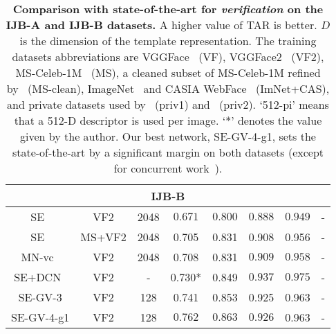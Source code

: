 \documentclass[runningheads]{llncs}
\begin{document}
\begin{table*}[t]
\begin{center}
{{\begin{tabular}{c|c|c|c|c|c|c|c}
\multicolumn{8}{c}{IJB-B} \\ \hline
SE~\cite{Cao18} & VF2 & 2048 &  $0.671$ & $0.800$ & $0.888$ & $0.949$ &  -\\
SE~\cite{Cao18}  & MS+VF2 & 2048 & 0.705 & 0.831 & 0.908 &0.956 & -\\

MN-vc~\cite{Xie18b} & VF2 & 2048 & 0.708 & 0.831 & $0.909$  & $0.958$ & - \\
SE+DCN~\cite{Xie18a} & VF2 & - & 0.730* & 0.849 & $\mathbf{0.937}$  & $\mathbf{0.975}$ & - \\

SE-GV-3 & VF2 & 128 & 0.741 & 0.853 & 0.925 & 0.963 & - \\
SE-GV-4-g1 & VF2  & 128 & $\mathbf{0.762}$ & $\mathbf{0.863}$ & $0.926$ & 0.963 & -\\



\hline
\end{tabular}}}
\end{center}
\vspace{-1.5mm}
\caption{\textbf{Comparison with state-of-the-art for
{\em verification} on the IJB-A and IJB-B datasets.}
A higher value of TAR is better.
$D$ is the dimension of the 
template representation.
The training datasets abbreviations are VGGFace~\cite{Parkhi15} (VF), 
VGGFace2~\cite{Cao18} (VF2), MS-Celeb-1M~\cite{Guo16} (MS),
a cleaned subset of MS-Celeb-1M refined by~\cite{Zheng18} (MS-clean),
ImageNet~\cite{Russakovsky15} and CASIA WebFace~\cite{Yi14} (ImNet+CAS),
and private datasets used by~\cite{Yang17} (priv1) and~\cite{Liu17} (priv2).
`512-pi' means that a 512-D descriptor 
is used per image. `*' denotes the value given by the author.
Our best network, SE-GV-4-g1, sets the state-of-the-art by a significant
margin on both datasets (except for concurrent work~\cite{Xie18a}).
}
\label{tab:ijba-ver}
\vspace{-5mm}
\end{table*}
\end{document}
